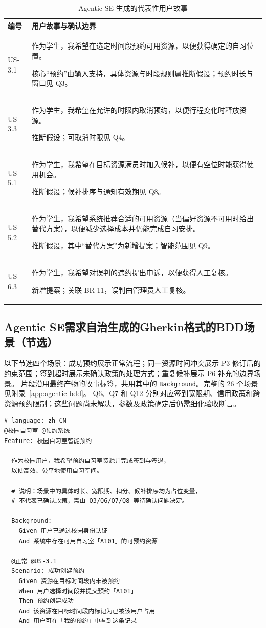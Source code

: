 \documentclass[11pt,a4paper]{article}
\begin{document}
\begin{longtable}{@{}p{}p{}@{}}
    \caption{Agentic SE 生成的代表性用户故事}\label{tab:agentic-story-sample} \\
    \toprule
    \textbf{编号} & \textbf{用户故事与确认边界} \\
    \midrule
    US-3.1 & 作为学生，我希望在选定时间段预约可用资源，以便获得确定的自习位置。\par {\small 核心“预约”由输入支持，具体资源与时段规则属推断假设；预约时长与窗口见 Q3。} \\
    \midrule
    US-3.3 & 作为学生，我希望在允许的时限内取消预约，以便行程变化时释放资源。\par {\small 推断假设；可取消时限见 Q4。} \\
    \midrule
    US-5.1 & 作为学生，我希望在目标资源满员时加入候补，以便有空位时能获得使用机会。\par {\small 推断假设；候补排序与通知有效期见 Q8。} \\
    \midrule
    US-5.2 & 作为学生，我希望系统推荐合适的可用资源（当偏好资源不可用时给出替代方案），以便减少选择成本并仍能完成自习安排。\par {\small 推断假设，其中“替代方案”为新增提案；智能范围见 Q9。} \\
    \midrule
    US-6.3 & 作为学生，我希望对误判的违约提出申诉，以便获得人工复核。\par {\small 新增提案；关联 BR-11，误判由管理员人工复核。} \\
    \bottomrule
\end{longtable}

\subsection{Agentic SE需求自治生成的Gherkin格式的BDD场景（节选）}
以下节选四个场景：成功预约展示正常流程；同一资源时间冲突展示 P3 修订后的约束范围；签到超时展示未确认政策的处理方式；重复候补展示 P6 补充的边界场景。
片段沿用最终产物的故事标签，共用其中的 \texttt{Background}。完整的 26 个场景见附录~\ref{app:agentic-bdd}。
Q6、Q7 和 Q12 分别对应签到宽限期、信用政策和跨资源预约限制；这些问题尚未解决，参数及政策确定后仍需细化验收断言。

\begin{framed}
\small
\begin{verbatim}
# language: zh-CN
@校园自习室 @预约系统
Feature: 校园自习室智能预约

  作为校园用户，我希望预约自习室资源并完成签到与签退，
  以便高效、公平地使用自习空间。

  # 说明：场景中的具体时长、宽限期、扣分、候补排序均为占位变量，
  # 不代表已确认政策，需由 Q3/Q6/Q7/Q8 等待确认问题决定。

  Background:
    Given 用户已通过校园身份认证
    And 系统中存在可用自习室「A101」的可预约资源

  @正常 @US-3.1
  Scenario: 成功创建预约
    Given 资源在目标时间段内未被预约
    When 用户选择时间段并提交预约「A101」
    Then 预约创建成功
    And 该资源在目标时间段内标记为已被该用户占用
    And 用户可在「我的预约」中看到这条记录
\end{verbatim}
\end{framed}
\end{document}
